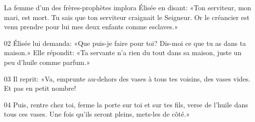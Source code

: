  La femme d’un des frères-prophètes implora Élisée en disant: «Ton serviteur, mon mari, est mort. Tu sais que ton serviteur craignait le Seigneur. Or le créancier est venu prendre pour lui mes deux enfants comme esclaves.»

02 Élisée lui demanda: «Que puis-je faire pour toi? Dis-moi ce que tu as dans ta maison.» Elle répondit: «Ta servante n’a rien du tout dans sa maison, juste un peu d’huile comme parfum.»

03 Il reprit: «Va, emprunte au-dehors des vases à tous tes voisins, des vases vides. Et pas en petit nombre!

04 Puis, rentre chez toi, ferme la porte sur toi et sur tes fils, verse de l’huile dans tous ces vases. Une fois qu’ils seront pleins, mets-les de côté.»
